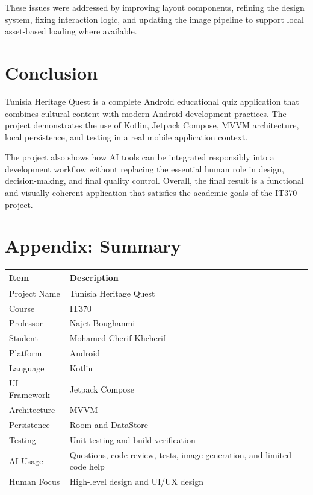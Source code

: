 \documentclass[12pt,a4paper]{article}
\begin{document}
These issues were addressed by improving layout components, refining the design system, fixing interaction logic, and updating the image pipeline to support local asset-based loading where available.

\section{Conclusion}
Tunisia Heritage Quest is a complete Android educational quiz application that combines cultural content with modern Android development practices. The project demonstrates the use of Kotlin, Jetpack Compose, MVVM architecture, local persistence, and testing in a real mobile application context.

The project also shows how AI tools can be integrated responsibly into a development workflow without replacing the essential human role in design, decision-making, and final quality control. Overall, the final result is a functional and visually coherent application that satisfies the academic goals of the IT370 project.

\section*{Appendix: Summary}

\begin{longtable}{p{} p{}}
\toprule
\textbf{Item} & \textbf{Description} \\
\midrule
Project Name & Tunisia Heritage Quest \\
Course & IT370 \\
Professor & Najet Boughanmi \\
Student & Mohamed Cherif Khcherif \\
Platform & Android \\
Language & Kotlin \\
UI Framework & Jetpack Compose \\
Architecture & MVVM \\
Persistence & Room and DataStore \\
Testing & Unit testing and build verification \\
AI Usage & Questions, code review, tests, image generation, and limited code help \\
Human Focus & High-level design and UI/UX design \\
\bottomrule
\end{longtable}
\end{document}
